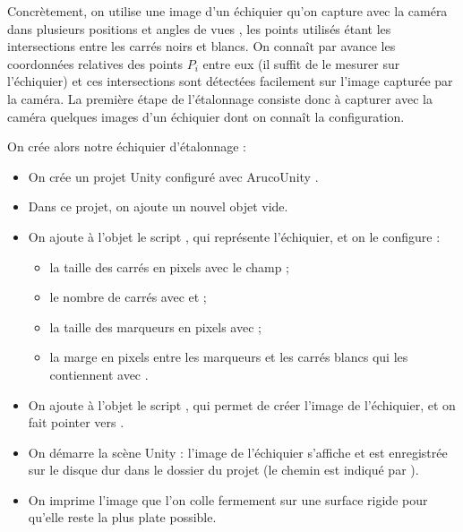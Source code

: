 
Concrètement, on utilise une image d'un échiquier qu'on capture avec la caméra dans plusieurs positions et angles de vues , les points utilisés étant les intersections entre les carrés noirs et blancs. On connaît par avance les coordonnées relatives des points $P_i$ entre eux (il suffit de le mesurer sur l'échiquier) et ces intersections sont détectées facilement sur l'image capturée par la caméra. La première étape de l'étalonnage consiste donc à capturer avec la caméra quelques images d'un échiquier dont on connaît la configuration.


On crée alors notre échiquier d'étalonnage  :
\begin{itemize}
  \item On crée un projet Unity configuré avec ArucoUnity .
  \item Dans ce projet, on ajoute un nouvel objet vide.
  \item On ajoute à l'objet le script , qui représente l'échiquier, et on le configure :
  \begin{itemize}
    \item la taille des carrés en pixels avec le champ  ;
    \item le nombre de carrés avec  et  ;
    \item la taille des marqueurs en pixels avec  ;
    \item la marge en pixels entre les marqueurs et les carrés blancs qui les contiennent avec .
  \end{itemize}
  \item On ajoute à l'objet le script , qui permet de créer l'image de l'échiquier, et on fait pointer  vers .
  \item On démarre la scène Unity : l'image de l'échiquier s'affiche et est enregistrée sur le disque dur dans le dossier du projet (le chemin est indiqué par ).
  \item On imprime l'image que l'on colle fermement sur une surface rigide pour qu'elle reste la plus plate possible.
\end{itemize}
\medskip

